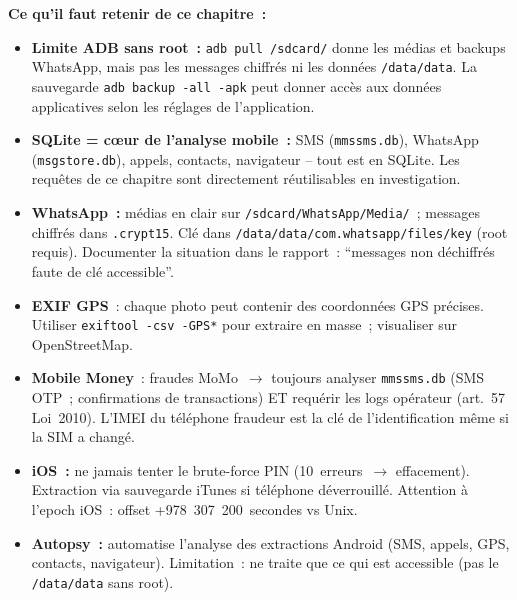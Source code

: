 \begin{boxresume}
\textbf{Ce qu'il faut retenir de ce chapitre~:}
\begin{itemize}
    \item \textbf{Limite ADB sans root~:} \texttt{adb pull /sdcard/}
          donne les médias et backups WhatsApp, mais pas les messages
          chiffrés ni les données \texttt{/data/data}. La sauvegarde
          \texttt{adb backup -all -apk} peut donner accès aux données
          applicatives selon les réglages de l'application.

    \item \textbf{SQLite = c\oe ur de l'analyse mobile~:} SMS
          (\texttt{mmssms.db}), WhatsApp (\texttt{msgstore.db}),
          appels, contacts, navigateur -- tout est en SQLite.
          Les requêtes de ce chapitre sont directement réutilisables
          en investigation.

    \item \textbf{WhatsApp~:} médias en clair sur \texttt{/sdcard/WhatsApp/Media/}~;
          messages chiffrés dans \texttt{.crypt15}. Clé dans
          \texttt{/data/data/com.whatsapp/files/key} (root requis).
          Documenter la situation dans le rapport~: ``messages non
          déchiffrés faute de clé accessible''.

    \item \textbf{EXIF GPS}~: chaque photo peut contenir des
          coordonnées GPS précises. Utiliser \texttt{exiftool -csv -GPS*}
          pour extraire en masse~; visualiser sur OpenStreetMap.

    \item \textbf{Mobile Money}~: fraudes MoMo~$\to$ toujours
          analyser \texttt{mmssms.db} (SMS OTP~; confirmations
          de transactions) ET requérir les logs opérateur
          (art.~57 Loi~2010). L'IMEI du téléphone fraudeur
          est la clé de l'identification même si la SIM a changé.

    \item \textbf{iOS~:} ne jamais tenter le brute-force PIN
          (10~erreurs~$\to$ effacement). Extraction via sauvegarde
          iTunes si téléphone déverrouillé. Attention à l'epoch
          iOS~: offset +978~307~200~secondes vs Unix.

    \item \textbf{Autopsy~:} automatise l'analyse des extractions
          Android (SMS, appels, GPS, contacts, navigateur). Limitation~:
          ne traite que ce qui est accessible (pas le \texttt{/data/data}
          sans root).
\end{itemize}
\end{boxresume}

